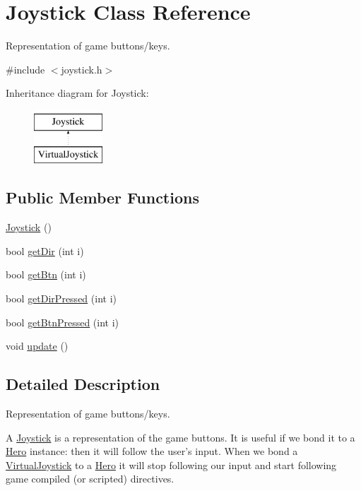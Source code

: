 \hypertarget{class_joystick}{\section{Joystick Class Reference}
\label{class_joystick}
}


Representation of game buttons/keys.  




{\ttfamily \#include $<$joystick.\-h$>$}

Inheritance diagram for Joystick\-:\begin{figure}[H]
\begin{center}
\leavevmode
\includegraphics[height=2.000000cm]{class_joystick}
\end{center}
\end{figure}
\subsection*{Public Member Functions}
\begin{DoxyCompactItemize}
\item 
\hyperlink{class_joystick_a158b1f77b78717efbf1b8fac43b1fcef}{Joystick} ()
\item 
bool \hyperlink{class_joystick_aceddfa0d39a5a6f7041c2951cb628060}{get\-Dir} (int i)
\item 
bool \hyperlink{class_joystick_a3a2c6a02979cd631a28f8ab7a5724fdb}{get\-Btn} (int i)
\item 
bool \hyperlink{class_joystick_a726d84c93e26cea55c8e4b2235a13e7e}{get\-Dir\-Pressed} (int i)
\item 
bool \hyperlink{class_joystick_a79399f1438c2ef54e5d8dd0ca59a2433}{get\-Btn\-Pressed} (int i)
\item 
void \hyperlink{class_joystick_a3c3fc5aa1a5482c172fa20f9661a9149}{update} ()
\end{DoxyCompactItemize}


\subsection{Detailed Description}
Representation of game buttons/keys. 

A \hyperlink{class_joystick}{Joystick} is a representation of the game buttons. It is useful if we bond it to a \hyperlink{class_hero}{Hero} instance\-: then it will follow the user's input. When we bond a \hyperlink{class_virtual_joystick}{Virtual\-Joystick} to a \hyperlink{class_hero}{Hero} it will stop following our input and start following game compiled (or scripted) directives. 

